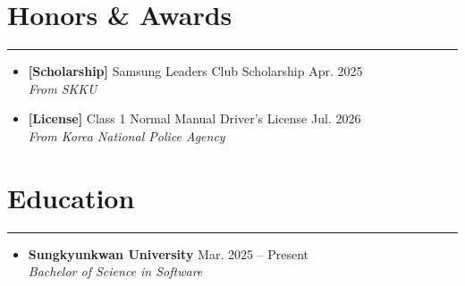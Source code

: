 \documentclass[letterpaper, 10pt]{article}
\begin{document}
\section*{Honors \& Awards}
\hrule
\vspace{4pt}
\begin{itemize}
    \item[]
        \textbf{[Scholarship]} Samsung Leaders Club Scholarship \hfill Apr. 2025 \\
        \textit{From SKKU}
    \item[]
        \textbf{[License]} Class 1 Normal Manual Driver's License \hfill Jul. 2026 \\
        \textit{From Korea National Police Agency}
\end{itemize}

\section*{Education}
\hrule
\vspace{4pt}
\begin{itemize}
    \item[]
        \textbf{Sungkyunkwan University} \hfill Mar. 2025 -- Present \\
        \textit{Bachelor of Science in Software}
\end{itemize}
\end{document}
